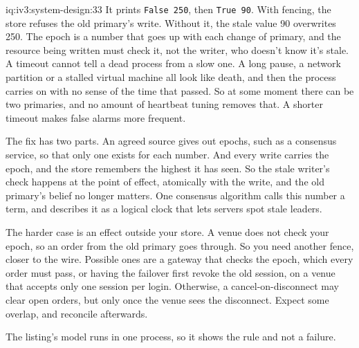 \begin{solution}{iq:iv3:system-design:33}
It prints \texttt{False 250}, then \texttt{True 90}. With fencing, the store refuses the old primary's write. Without it, the stale value 90 overwrites 250. The epoch is a number that goes up with each change of primary, and the resource being written must check it, not the writer, who doesn't know it's stale.
A timeout cannot tell a dead process from a slow one. A long pause, a network partition or a stalled virtual machine all look like death, and then the process carries on with no sense of the time that passed. So at some moment there can be two primaries, and no amount of heartbeat tuning removes that. A shorter timeout makes false alarms more frequent.

The fix has two parts. An agreed source gives out epochs, such as a consensus service, so that only one exists for each number. And every write carries the epoch, and the store remembers the highest it has seen. So the stale writer's check happens at the point of effect, atomically with the write, and the old primary's belief no longer matters. One consensus algorithm calls this number a term, and describes it as a logical clock that lets servers spot stale leaders.

The harder case is an effect outside your store. A venue does not check your epoch, so an order from the old primary goes through. So you need another fence, closer to the wire. Possible ones are a gateway that checks the epoch, which every order must pass, or having the failover first revoke the old session, on a venue that accepts only one session per login. Otherwise, a cancel-on-disconnect may clear open orders, but only once the venue sees the disconnect. Expect some overlap, and reconcile afterwards.

The listing's model runs in one process, so it shows the rule and not a failure.

\end{solution}

